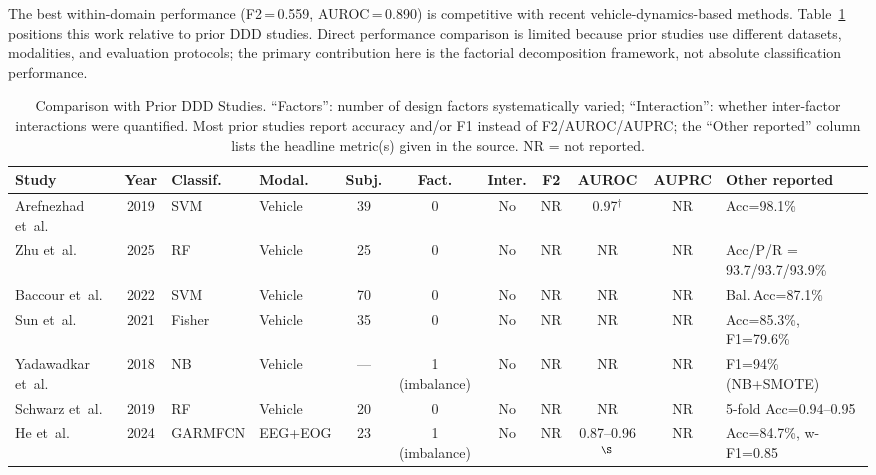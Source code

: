 \documentclass[lettersize,journal]{IEEEtran}
\begin{document}
The best within-domain performance (F2\,=\,0.559, AUROC\,=\,0.890) is competitive with recent vehicle-dynamics-based methods.
Table~\ref{tab:comparison} positions this work relative to prior DDD studies.
Direct performance comparison is limited because prior studies use different datasets, modalities, and evaluation protocols; the primary contribution here is the factorial decomposition framework, not absolute classification performance.

\begin{table}[!t]
\caption{Comparison with Prior DDD Studies. ``Factors'': number of design factors systematically varied; ``Interaction'': whether inter-factor interactions were quantified. Most prior studies report accuracy and/or F1 instead of F2/AUROC/AUPRC; the ``Other reported'' column lists the headline metric(s) given in the source. NR = not reported.\label{tab:comparison}}
\centering
\scriptsize
\setlength{\tabcolsep}{3pt}
\begin{tabular}{|l|c|l|l|c|c|c|c|c|c|p{2.6cm}|}
\hline
Study & Year & Classif. & Modal. & Subj. & Fact. & Inter. & F2 & AUROC & AUPRC & Other reported \\
\hline
Arefnezhad et~al.~\cite{arefnezhad2019}   & 2019 & SVM       & Vehicle & 39 & 0            & No               & NR & 0.97$^{\dagger}$ & NR & {\scriptsize Acc=98.1\%} \\
\hline
Zhu et~al.~\cite{zhu2025}                  & 2025 & RF        & Vehicle & 25 & 0            & No               & NR & NR & NR & {\scriptsize Acc/P/R = 93.7/93.7/93.9\%} \\
\hline
Baccour et~al.~\cite{baccour2022}          & 2022 & SVM       & Vehicle & 70 & 0            & No               & NR & NR & NR & {\scriptsize Bal.\,Acc=87.1\%} \\
\hline
Sun et~al.~\cite{sun2021}                  & 2021 & Fisher    & Vehicle & 35 & 0            & No               & NR & NR & NR & {\scriptsize Acc=85.3\%, F1=79.6\%} \\
\hline
Yadawadkar et~al.~\cite{yadawadkar2018}   & 2018 & NB        & Vehicle & ---& 1 (imbalance)& No               & NR & NR & NR & {\scriptsize F1=94\% (NB+SMOTE)} \\
\hline
Schwarz et~al.~\cite{schwarz2019}          & 2019 & RF        & Vehicle & 20 & 0            & No               & NR & NR & NR & {\scriptsize 5-fold Acc=0.94--0.95} \\
\hline
He et~al.~\cite{he2024}                    & 2024 & GARMFCN   & EEG+EOG & 23 & 1 (imbalance)& No               & NR & 0.87--0.96$^{\S}$ & NR & {\scriptsize Acc=84.7\%, w-F1=0.85} \\

\end{tabular}
\end{table}
\end{document}

